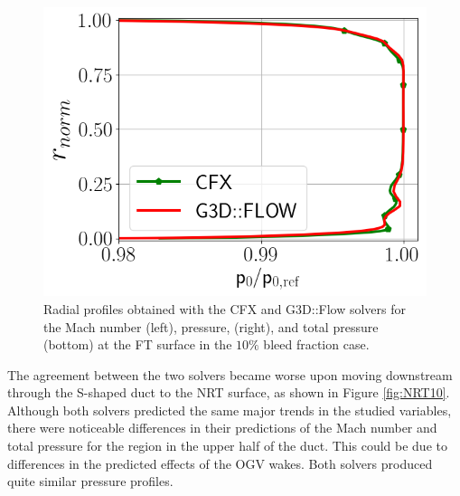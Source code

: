 \begin{figure}[h!]
\begin{minipage}{0.48\columnwidth}
  \end{minipage}
  \begin{minipage}{0.48\columnwidth}
  \includegraphics[width=1.\textwidth]{Figures/P0Mave_FT.png}
  \end{minipage}
  \caption{Radial profiles obtained with the CFX and G3D::Flow solvers for the Mach number (left), pressure, (right), and total pressure (bottom)  at the FT surface in the $10\%$ bleed fraction case.} \label{fig:FT10}
\end{figure}

The agreement between the two solvers became worse upon moving downstream through the S-shaped duct to the NRT surface, as shown in Figure \ref{fig:NRT10}. Although both solvers predicted the same major trends in the studied variables, there were noticeable differences in their predictions of the Mach number and total pressure for the region in the upper half of the duct. This could be due to differences in the predicted effects of the OGV wakes. Both solvers produced quite similar pressure profiles.

